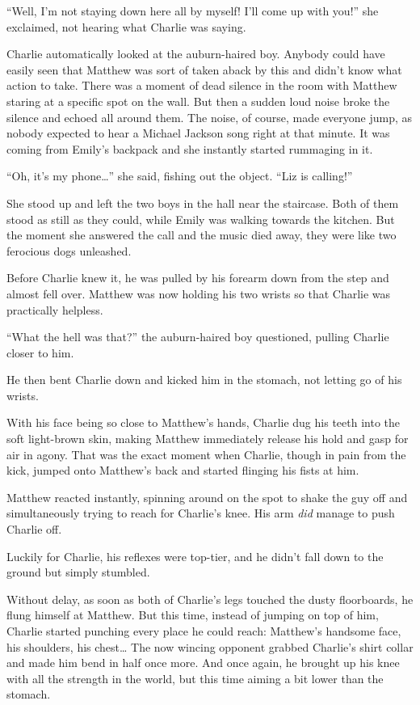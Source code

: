 “Well, I'm not staying down here all by myself! I'll come up with you!” she exclaimed, not hearing what Charlie was saying.

Charlie automatically looked at the auburn-haired boy. Anybody could have easily seen that Matthew was sort of taken aback by this and didn't know what action to take. There was a moment of dead silence in the room with Matthew staring at a specific spot on the wall. But then a sudden loud noise broke the silence and echoed all around them. The noise, of course, made everyone jump, as nobody expected to hear a Michael Jackson song right at that minute. It was coming from Emily's backpack and she instantly started rummaging in it.

“Oh, it's my phone…” she said, fishing out the object. “Liz is calling!”

She stood up and left the two boys in the hall near the staircase. Both of them stood as still as they could, while Emily was walking towards the kitchen. But the moment she answered the call and the music died away, they were like two ferocious dogs unleashed.

Before Charlie knew it, he was pulled by his forearm down from the step and almost fell over. Matthew was now holding his two wrists so that Charlie was practically helpless.

“What the hell was that?” the auburn-haired boy questioned, pulling Charlie closer to him.

He then bent Charlie down and kicked him in the stomach, not letting go of his wrists.

With his face being so close to Matthew's hands, Charlie dug his teeth into the soft light-brown skin, making Matthew immediately release his hold and gasp for air in agony. That was the exact moment when Charlie, though in pain from the kick, jumped onto Matthew's back and started flinging his fists at him.

Matthew reacted instantly, spinning around on the spot to shake the guy off and simultaneously trying to reach for Charlie's knee. His arm \textit{did} manage to push Charlie off.

Luckily for Charlie, his reflexes were top-tier, and he didn't fall down to the ground but simply stumbled.

Without delay, as soon as both of Charlie's legs touched the dusty floorboards, he flung himself at Matthew. But this time, instead of jumping on top of him, Charlie started punching every place he could reach: Matthew's handsome face, his shoulders, his chest… The now wincing opponent grabbed Charlie's shirt collar and made him bend in half once more. And once again, he brought up his knee with all the strength in the world, but this time aiming a bit lower than the stomach.

